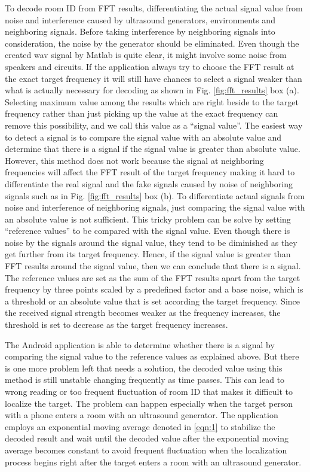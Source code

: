 To decode room ID from FFT results, differentiating the actual signal value from noise and interference caused by ultrasound generators, environments and neighboring signals. Before taking interference by neighboring signals into consideration, the noise by the generator should be eliminated. Even though the created wav signal by Matlab is quite clear, it might involve some noise from speakers and circuits. If the application always try to choose the FFT result at the exact target frequency it will still have chances to select a signal weaker than what is actually necessary for decoding as shown in Fig. \ref{fig:fft_results} box (a). Selecting maximum value among the results which are right beside to the target frequency rather than just picking up the value at the exact frequency can remove this possibility, and we call this value as a “signal value”. The easiest way to detect a signal is to compare the signal value with an absolute value and determine that there is a signal if the signal value is greater than absolute value. However, this method does not work because the signal at neighboring frequencies will affect the FFT result of the target frequency making it hard to differentiate the real signal and the fake signals caused by noise of neighboring signals such as in Fig. \ref{fig:fft_results} box (b). To differentiate actual signals from noise and interference of neighboring signals, just comparing the signal value with an absolute value is not sufficient. This tricky problem can be solve by setting “reference values” to be compared with the signal value. Even though there is noise by the signals around the signal value, they tend to be diminished as they get further from its target frequency. Hence, if the signal value is greater than FFT results around the signal value, then we can conclude that there is a signal. The reference values are set as the sum of the FFT results apart from the target frequency by three points scaled by a predefined factor and a base noise, which is a threshold or an absolute value that is set according the target frequency. Since the received signal strength becomes weaker as the frequency increases, the threshold is set to decrease as the target frequency increases.

The Android application is able to determine whether there is a signal by comparing the signal value to the reference values as explained above. But there is one more problem left that needs a solution, the decoded value using this method is still unstable changing frequently as time passes. This can lead to wrong reading or too frequent fluctuation of room ID that makes it difficult to localize the target.  The problem can happen especially when the target person with a phone enters a room with an ultrasound generator. The application employs an exponential moving average denoted in \ref{eqn:1} to stabilize the decoded result and wait until the decoded value after the exponential moving average becomes constant to avoid frequent fluctuation when the localization process begins right after the target enters a room with an ultrasound generator.

